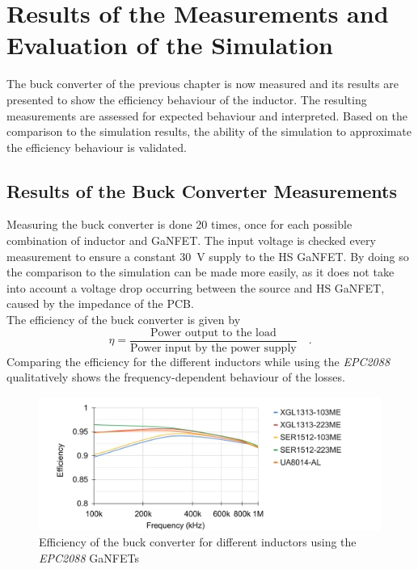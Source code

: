 \chapter{Results of the Measurements and Evaluation of the Simulation} \label{sec:cha6}
The buck converter of the previous chapter is now measured and its results are presented to show the efficiency behaviour of the inductor. The resulting measurements are assessed for expected behaviour and interpreted. Based on the comparison to the simulation results, the ability of the simulation to approximate the efficiency behaviour is validated.

\section{Results of the Buck Converter Measurements}\label{sec:results_of_the_bc_measurement}
Measuring the buck converter is done 20 times, once for each possible combination of inductor and \ac{GaNFET}. The input voltage is checked every measurement to ensure a constant \SI{30}{V} supply to the \ac{HS} \ac{GaNFET}. By doing so the comparison to the simulation can be made more easily, as it does not take into account a voltage drop occurring between the source and \ac{HS} \ac{GaNFET}, caused by the impedance of the \ac{PCB}.\\
The efficiency of the buck converter is given by
\begin{equation}
    \eta = \frac{\text{Power output to the load}}{\text{Power input by the power supply}} \quad\text{.}
\end{equation}
Comparing the efficiency for the different inductors while using the \textit{EPC2088} qualitatively shows the frequency-dependent behaviour of the losses. 
\begin{figure}[H]
    \centering
    \includegraphics[width=0.95\linewidth]{Bilder//Kapitel4/BC_Meas_Efficiency_Inductor_EPC2088.pdf}
    \caption{Efficiency of the buck converter for different inductors using the \textit{EPC2088} \acp{GaNFET}}
    \label{fig:efficiency_bc_inductors}
\end{figure}

